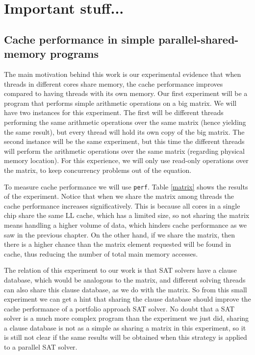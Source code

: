 \documentclass[12pt]{diicc}
\begin{document}
%  
\chapter{Important stuff...}\label{chap:contributions}

\section{Cache performance in simple parallel-shared-memory programs}

The main motivation behind this work is our experimental evidence that when threads in different cores share memory, the cache performance improves compared to having threads with its own memory. Our first experiment will be a program that performs simple arithmetic operations on a big matrix. We will have two instances for this experiment. The first will be different threads performing the same arithmetic operations over the same matrix (hence yielding the same result), but every thread will hold its own copy of the big matrix. The second instance will be the same experiment, but this time the different threads will perform the arithmetic operations over the same matrix (regarding physical memory location). For this experience, we will only use read-only operations over the matrix, to keep concurrency problems out of the equation.

To measure cache performance we will use \texttt{perf}. Table \ref{matrix} shows the results of the experiment. Notice that when we share the matrix among threads the cache performance increases significatively. This is because all cores in a single chip share the same LL cache, which has a limited size, so not sharing the matrix means handling a higher volume of data, which hinders cache performance as we saw in the previous chapter. On the other hand, if we share the matrix, then there is a higher chance than the matrix element requested will be found in cache, thus reducing the number of total main memory accesses.

The relation of this experiment to our work is that SAT solvers have a clause database, which would be analogous to the matrix, and different solving threads can also share this clause database, as we do with the matrix. So from this small experiment we can get a hint that sharing the clause database should improve the cache performance of a portfolio approach SAT solver. No doubt that a SAT solver is a much more complex program than the experiment we just did, sharing a clause database is not as a simple as sharing a matrix in this experiment, so it is still not clear if the same results will be obtained when this strategy is applied to a parallel SAT solver.
\end{document}
